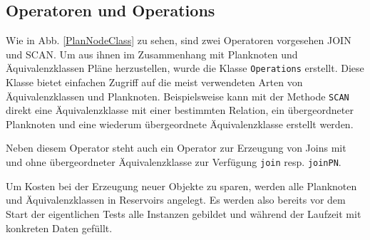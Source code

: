 


\subsection{Operatoren und Operations}
Wie in Abb. \ref{PlanNodeClass} zu sehen, sind zwei Operatoren vorgesehen JOIN und SCAN. Um aus ihnen im Zusammenhang mit Planknoten und Äquivalenzklassen Pläne herzustellen, wurde die Klasse \texttt{Operations} erstellt. Diese Klasse bietet einfachen Zugriff auf die meist verwendeten Arten von Äquivalenzklassen und Planknoten. Beispielsweise kann mit der Methode \texttt{SCAN} direkt eine Äquivalenzklasse mit einer bestimmten Relation, ein übergeordneter Planknoten und eine wiederum übergeordnete Äquivalenzklasse erstellt werden.

Neben diesem Operator steht auch ein Operator zur Erzeugung von Joins mit und ohne übergeordneter Äquivalenzklasse zur Verfügung \texttt{join} resp. \texttt{joinPN}.

Um Kosten bei der Erzeugung neuer Objekte zu sparen, werden alle Planknoten und Äquivalenzklassen in Reservoirs angelegt. Es werden also bereits vor dem Start der eigentlichen Tests alle Instanzen gebildet und während der Laufzeit mit konkreten Daten gefüllt.
